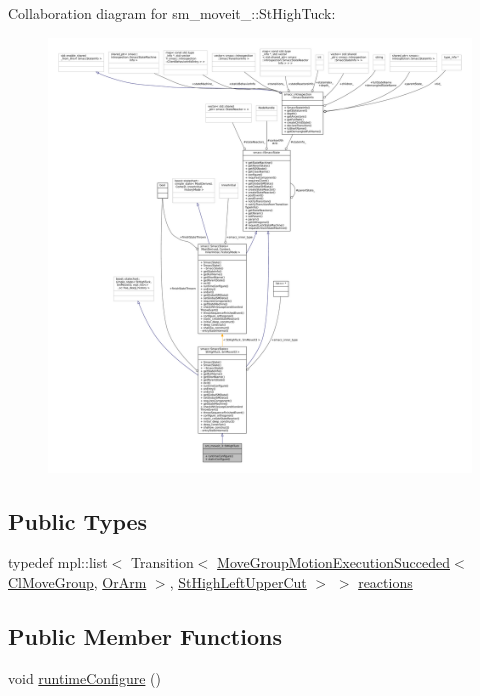 Collaboration diagram for sm\+\_\+moveit\+\_\+:\+:St\+High\+Tuck\+:
\nopagebreak
\begin{figure}[H]
\begin{center}
\leavevmode
\includegraphics[width=350pt]{structsm__moveit__3_1_1StHighTuck__coll__graph}
\end{center}
\end{figure}
\subsection*{Public Types}
\begin{DoxyCompactItemize}
\item 
typedef mpl\+::list$<$ Transition$<$ \hyperlink{structmoveit__z__client_1_1MoveGroupMotionExecutionSucceded}{Move\+Group\+Motion\+Execution\+Succeded}$<$ \hyperlink{classmoveit__z__client_1_1ClMoveGroup}{Cl\+Move\+Group}, \hyperlink{classsm__moveit__3_1_1OrArm}{Or\+Arm} $>$, \hyperlink{structsm__moveit__3_1_1StHighLeftUpperCut}{St\+High\+Left\+Upper\+Cut} $>$ $>$ \hyperlink{structsm__moveit__3_1_1StHighTuck_aa368fa2efc361892c3130c432790d16e}{reactions}
\end{DoxyCompactItemize}
\subsection*{Public Member Functions}
\begin{DoxyCompactItemize}
\item 
void \hyperlink{structsm__moveit__3_1_1StHighTuck_a9a247958dbc1a1ab3ef0a287f6688218}{runtime\+Configure} ()
\end{DoxyCompactItemize}
